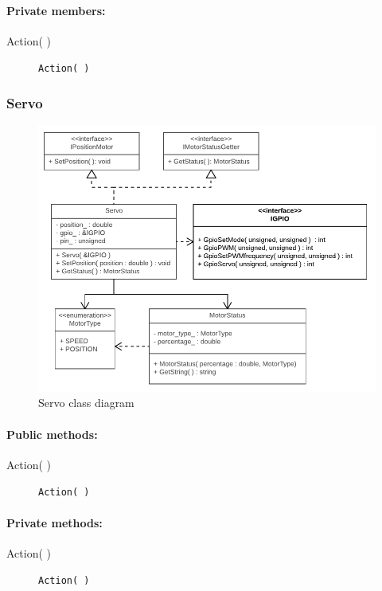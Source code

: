 \paragraph{Private members:}
\begin{adjustwidth}{2.5em}{0pt}\begin{description}
		\item [Action( )] \texttt{Action( )}
\end{description}\end{adjustwidth}

\subsubsection{Servo}

\begin{figure}[H]
\centering
\includegraphics[width=1\linewidth]{Images/Design/Servo_class_diagram}
\caption{Servo class diagram}
\label{fig:servo}
\end{figure}

\paragraph{Public methods:}
\begin{adjustwidth}{2.5em}{0pt}\begin{description}
		\item [Action( )] \texttt{Action( )}
\end{description}\end{adjustwidth}

\paragraph{Private methods:}
\begin{adjustwidth}{2.5em}{0pt}\begin{description}
		\item [Action( )] \texttt{Action( )}
\end{description}\end{adjustwidth}

